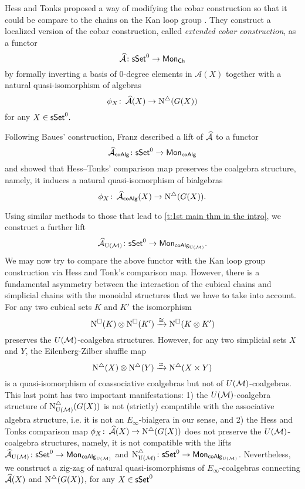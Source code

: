 Hess and Tonks proposed a way of modifying the cobar construction so that it could be compare to the chains on the Kan loop group \cite{hess2010cobar}. They construct a localized version of the cobar construction, called \textit{extended cobar construction}, as a functor
$$\operatorname{\mathcal{\widehat{A}}} \colon \mathsf{sSet}^0 \to \mathsf{Mon}_{\mathsf{Ch}}$$
by formally inverting a basis of $0$-degree elements in $\mathcal{A}(X)$ together with a natural quasi-isomorphism of algebras
\begin{equation*}
\phi_X \colon \operatorname{\mathcal{\widehat{A}}}(X) \to \operatorname{N^{\triangle}}(G(X))
\end{equation*}
for any $X \in \mathsf{sSet}^0.$

Following Baues’ construction, Franz described a lift of $\operatorname{\mathcal{\widehat{A}}}$ to a functor
\begin{equation*}
\operatorname{\mathcal{\widehat{A}}}_{\mathsf{coAlg}} \colon \mathsf{sSet}^0 \to \mathsf{Mon}_{\mathsf{coAlg}}
\end{equation*}
and showed that Hess--Tonks' comparison map preserves the coalgebra structure, namely, it induces a natural quasi-isomorphism of bialgebras
\begin{equation*}
\phi_X \colon \operatorname{\mathcal{\widehat{A}}}_{\mathsf{coAlg}}(X) \to \operatorname{N^{\triangle}} (G(X)).
\end{equation*}

Using similar methods to those that lead to \cref{t:1st main thm in the intro}, we construct a further lift
\begin{equation*}
\operatorname{\mathcal{\widehat{A}}}_{\operatorname{U}(\mathcal{M})} \colon \mathsf{sSet}^0 \to \mathsf{Mon}_{\mathsf{coAlg}_{\operatorname{U}(\mathcal{M})}}.
\end{equation*}
We may now try to compare the above functor with the Kan loop group construction via Hess and Tonk's comparison map. However, there is a fundamental asymmetry between the interaction of the cubical chains and simplicial chains with the monoidal structures that we have to take into account. For any two cubical sets $K$ and $K'$ the isomorphism $$\operatorname{N^{\square}}(K) \otimes \operatorname{N^{\square}}(K') \xrightarrow{\cong} \operatorname{N^{\square}}(K \otimes K')$$ preserves the $U(\mathcal{M})$-coalgebra structures. However, for any two simplicial sets $X$ and $Y$, the Eilenberg-Zilber shuffle map $$\operatorname{N^{\triangle}}(X) \otimes \operatorname{N^{\triangle}}(Y) \xrightarrow{\simeq} \operatorname{N^{\triangle}}(X \times Y)$$ is a quasi-isomorphism of coassociative coalgebras but not of $U(\mathcal{M})$-coalgebras. This last point has two important manifestations: 1) the $U(\mathcal{M})$-coalgebra structure of $\operatorname{N^{\triangle}_{{\operatorname{U}(\mathcal{M})}}}(G(X))$ is not (strictly) compatible with the associative algebra structure, i.e. it is not an $E_{\infty}$-bialgera in our sense, and 2) the Hess and Tonks comparison map $\phi_X \colon \operatorname{\mathcal{\widehat{A}}}(X) \to \operatorname{N^{\triangle}}(G(X))$ does not preserve the $U(\mathcal{M})$-coalgebra structures, namely, it is not compatible with the lifts $\operatorname{\mathcal{\widehat{A}}}_{\operatorname{U}(\mathcal{M})} \colon \mathsf{sSet}^0 \to \mathsf{Mon}_{\mathsf{coAlg}_{\operatorname{U}(\mathcal{M})}}$
and $\operatorname{N^{\triangle}_{{\operatorname{U}(\mathcal{M})}}} \colon \mathsf{sSet}^0 \to \mathsf{Mon}_{\mathsf{coAlg}_{\operatorname{U}(\mathcal{M})}}$. Nevertheless, we construct a zig-zag of natural quasi-isomorphisms of $E_{\infty}$-coalgebras connecting $\operatorname{\mathcal{\widehat{A}}}(X)$ and $\operatorname{N^{\triangle}}(G(X))$, for any $X \in \mathsf{sSet}^0$

